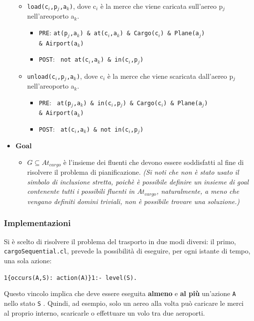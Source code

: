 \documentclass[a4paper,oneside,12pt]{book}
\begin{document}
\begin{itemize}
\begin{itemize}
\begin{itemize}
            \end{itemize}
            \item \texttt{load(c$_i$,p$_{j}$,a$_{k}$)}, dove c$_i$ è la merce che viene caricata
            sull'aereo p$_{j}$ nell'areoporto a$_{k}$.
            \begin{itemize}
                \item \texttt{PRE}:
                \texttt{at(p$_j$,a$_k$) \& at(c$_i$,a$_k$) \& Cargo(c$_i$) \& Plane(a$_j$)\\ \& Airport(a$_k$)}
                \item \texttt{POST}: \texttt{ not at(c$_i$,a$_k$) \& in(c$_i$,p$_j$)}
            \end{itemize}
            \item \texttt{unload(c$_i$,p$_{j}$,a$_{k}$)}, dove c$_i$ è la merce che viene scaricata
            dall'aereo p$_{j}$ nell'areoporto a$_{k}$.
            \begin{itemize}
                \item \texttt{PRE}:
                \texttt{ at(p$_j$,a$_k$) \& in(c$_i$,p$_j$) \& Cargo(c$_i$) \& Plane(a$_j$)\\ \& Airport(a$_k$)}
                \item \texttt{POST}: \texttt{ at(c$_i$,a$_k$) \& not in(c$_i$,p$_j$)}
            \end{itemize}
        \end{itemize}
        \item \textbf{Goal}
        \begin{itemize}
            \item $G \subseteq At_{cargo}$ è l'insieme dei fluenti che devono essere soddisfatti al fine
            di risolvere il problema di pianificazione. \textit{(Si noti che non è stato usato il simbolo di
            inclusione stretta, poichè è possibile definire un insieme di goal contenente tutti i possibili
            fluenti in $At_{cargo}$, naturalmente, a meno che vengano definiti domini triviali,
            non è possibile trovare una soluzione.)}
        \end{itemize}
    \end{itemize}

    \subsubsection*{Implementazioni}
    Si è scelto di risolvere il problema del trasporto in due modi diversi: il primo, \texttt{cargoSequential.cl},
    prevede la possibilità di eseguire, per ogni istante di tempo, una sola azione:
    \begin{center}
        \texttt{1\{occurs(A,S): action(A)\}1:- level(S).}
    \end{center}
    Questo vincolo implica che deve essere eseguita \textbf{almeno} e \textbf{al più} un'azione
    \texttt{A} nello stato \texttt{S} .
    Quindi, ad esempio, solo un aereo alla volta può caricare le merci al proprio interno,
    scaricarle o effettuare un volo tra due aeroporti.
\end{document}
